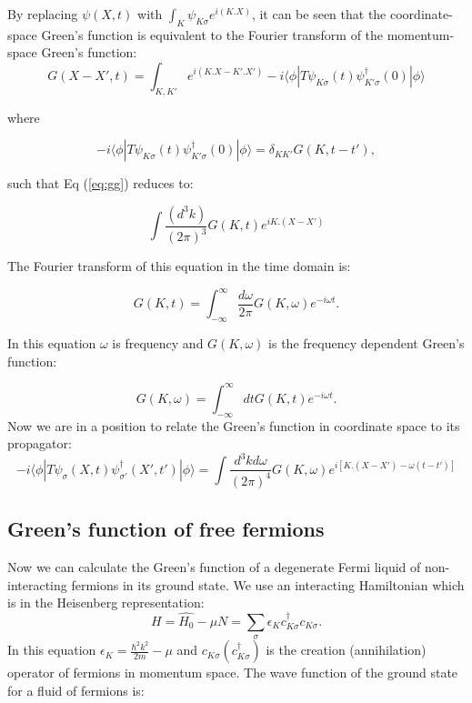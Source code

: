 By replacing $\psi(X,t)$ with $\int_K\psi_{K\sigma}e^{i(K.X)}$, it can be seen that the coordinate-space Green's function is equivalent to the Fourier transform of the momentum-space Green's function:
\begin{equation}
    G(X-X',t)= \int_{K,K'}e^{i(K.X-K'.X')}-i \langle\phi|T\psi_{K\sigma}(t)\psi_{K'\sigma}^\dagger(0)|\phi\rangle
    \label{eq:gg}
\end{equation}

\noindent where 

\begin{equation}
    -i \langle\phi|T\psi_{K\sigma}(t)\psi_{K'\sigma}^\dagger(0)|\phi\rangle= \delta_{KK'}G(K,t-t'),
\end{equation}

\noindent such that Eq (\ref{eq:gg}) reduces to:

\begin{equation}
     \int\frac{(d^3k)}{(2\pi)^3}G(K,t)e^{iK.(X-X')}
\end{equation}

The Fourier transform of this equation in the time domain is:

\begin{equation}
    G(K,t)=\int_{-\infty}^{\infty}\frac{d\omega}{2\pi}G(K,\omega)e^{-i\omega t} .
\end{equation}

\noindent In this equation $\omega$ is frequency and $G(K,\omega)$ is the frequency dependent Green's function:

\begin{equation}
    G(K,\omega)=\int_{-\infty}^{\infty} dtG(K,t)e^{-i\omega t} .
\end{equation}
Now we are in a position to relate the Green's function in coordinate space to its propagator:
\begin{equation}
    -i \langle\phi|T\psi_{\sigma}(X,t)\psi_{\sigma'}^\dagger(X',t')|\phi\rangle=\int \frac{d^3kd\omega}{(2\pi)^4}G(K,\omega)e^{i[K.(X-X')-\omega(t-t')]}
    \label{eq:sprop}
\end{equation}

\subsection{Green's function of free fermions}
Now we can calculate the Green's function of a degenerate Fermi liquid of non-interacting fermions in its ground state.  We use an interacting Hamiltonian which is in the Heisenberg representation:
\begin{equation}
    H=\hat{H_0}-\mu N=\sum_{\sigma}\epsilon_Kc_{K\sigma}^\dagger c_{K\sigma}.
\end{equation}
In this equation $\epsilon_K=\frac{\hbar^2k^2}{2m}-\mu$ and $c_{K \sigma}(c_{K \sigma}^\dagger)$ is the creation (annihilation) operator of fermions in momentum space. The wave function of the ground state for a fluid of fermions is:

